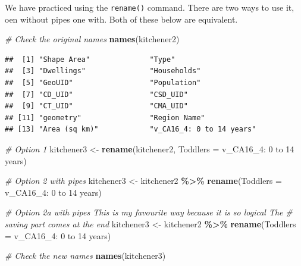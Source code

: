\documentclass[
]{article}
\newenvironment{Shaded}{\begin{snugshade}}{\end{snugshade}}
\newcommand{\CommentTok}[1]{\textcolor[rgb]{0.56,0.35,0.01}{\textit{#1}}}
\newcommand{\DataTypeTok}[1]{\textcolor[rgb]{0.13,0.29,0.53}{#1}}
\newcommand{\KeywordTok}[1]{\textcolor[rgb]{0.13,0.29,0.53}{\textbf{#1}}}
\newcommand{\NormalTok}[1]{#1}
\newcommand{\OperatorTok}[1]{\textcolor[rgb]{0.81,0.36,0.00}{\textbf{#1}}}
\newcommand{\StringTok}[1]{\textcolor[rgb]{0.31,0.60,0.02}{#1}}
\begin{document}
We have practiced using the \texttt{rename()} command. There are two
ways to use it, oen without pipes one with. Both of these below are
equivalent.

\begin{Shaded}
\begin{Highlighting}[]
\CommentTok{\# Check the original names}
\KeywordTok{names}\NormalTok{(kitchener2)}
\end{Highlighting}
\end{Shaded}

\begin{verbatim}
##  [1] "Shape Area"              "Type"                   
##  [3] "Dwellings"               "Households"             
##  [5] "GeoUID"                  "Population"             
##  [7] "CD_UID"                  "CSD_UID"                
##  [9] "CT_UID"                  "CMA_UID"                
## [11] "geometry"                "Region Name"            
## [13] "Area (sq km)"            "v_CA16_4: 0 to 14 years"
\end{verbatim}

\begin{Shaded}
\begin{Highlighting}[]
\CommentTok{\# Option 1}
\NormalTok{kitchener3 <{-}}\StringTok{ }\KeywordTok{rename}\NormalTok{(kitchener2, }\DataTypeTok{Toddlers =} \StringTok{\textasciigrave{}}\DataTypeTok{v\_CA16\_4: 0 to 14 years}\StringTok{\textasciigrave{}}\NormalTok{)}

\CommentTok{\# Option 2 with pipes}
\NormalTok{kitchener3 <{-}}\StringTok{ }\NormalTok{kitchener2 }\OperatorTok{\%>\%}\StringTok{ }\KeywordTok{rename}\NormalTok{(}\DataTypeTok{Toddlers =} \StringTok{\textasciigrave{}}\DataTypeTok{v\_CA16\_4: 0 to 14 years}\StringTok{\textasciigrave{}}\NormalTok{)}

\CommentTok{\# Option 2a with pipes This is my favourite way because it is so logical The}
\CommentTok{\# saving part comes at the end}
\NormalTok{kitchener3 <{-}}\StringTok{ }\NormalTok{kitchener2 }\OperatorTok{\%>\%}\StringTok{ }\KeywordTok{rename}\NormalTok{(}\DataTypeTok{Toddlers =} \StringTok{\textasciigrave{}}\DataTypeTok{v\_CA16\_4: 0 to 14 years}\StringTok{\textasciigrave{}}\NormalTok{)}
\end{Highlighting}
\end{Shaded}

\begin{Shaded}
\begin{Highlighting}[]
\CommentTok{\# Check the new names}
\KeywordTok{names}\NormalTok{(kitchener3)}
\end{Highlighting}
\end{Shaded}
\end{document}
